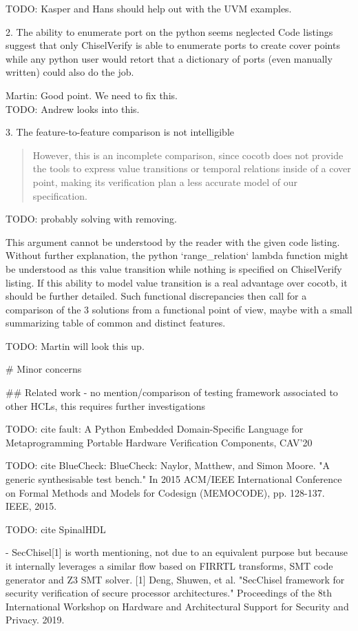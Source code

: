 \documentclass{article}
\newcommand{\todo}[1]{{\color{olive} TODO: #1}}
\newcommand{\martin}[1]{{\color{blue} Martin: #1\\}}
\begin{document}
\todo{Kasper and Hans should help out with the UVM examples.}

2. The ability to enumerate port on the python seems neglected
Code listings suggest that only ChiselVerify is able to enumerate ports to create cover points while any python user would retort that a dictionary of ports (even manually written) could also do the job.

\martin{Good point. We need to fix this.}
\todo{Andrew looks into this.}

3. The feature-to-feature comparison is not intelligible 
\begin{quote}
However, this is
an incomplete comparison, since cocotb does not provide the
tools to express value transitions or temporal relations inside
of a cover point, making its verification plan a less accurate
model of our specification. 
\end{quote}


\todo{probably solving with removing.}

This argument cannot be understood by the reader with the given code listing.
Without further explanation, the python `range\_relation` lambda function might be understood as this value transition while nothing is specified on ChiselVerify listing.
If this ability to model value transition is a real advantage over cocotb, it should be further detailed.
Such functional discrepancies then call for a comparison of the 3 solutions from a functional point of view, maybe with a small summarizing table of common and distinct features.

\todo{Martin will look this up.}

\# Minor concerns

\#\# Related work
- no mention/comparison of testing framework associated to other HCLs, this requires further investigations

\todo{cite fault: A Python Embedded Domain-Specific Language for Metaprogramming Portable Hardware Verification Components, CAV'20}

\todo{cite BlueCheck: BlueCheck: Naylor, Matthew, and Simon Moore. "A generic synthesisable test bench." In 2015 ACM/IEEE International Conference on Formal Methods and Models for Codesign (MEMOCODE), pp. 128-137. IEEE, 2015.}

\todo{cite SpinalHDL}

- SecChisel[1] is worth mentioning, not due to an equivalent purpose but because it internally leverages a similar flow based on FIRRTL transforms, SMT code generator and Z3 SMT solver.
[1] Deng, Shuwen, et al. "SecChisel framework for security verification of secure processor architectures." Proceedings of the 8th International Workshop on Hardware and Architectural Support for Security and Privacy. 2019.
\end{document}

